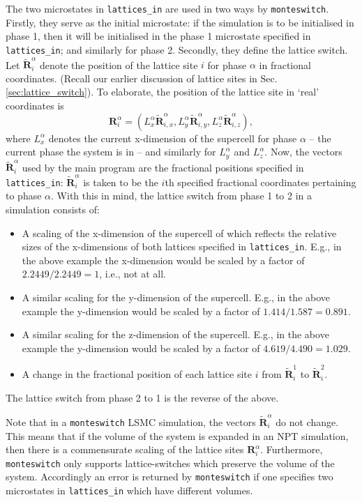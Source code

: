 \documentclass{report}
\begin{document}
The two microstates in \texttt{lattices\_in} are used in two ways by \texttt{monteswitch}. Firstly, they serve as the initial microstate: if the 
simulation is to be initialised in phase 1, then it will be initialised in the phase 1 microstate specified in \texttt{lattices\_in}; and 
similarly for phase 2. Secondly, they define the lattice switch. Let $\tilde{\mathbf{R}}^{\alpha}_i$ denote the position of the lattice site $i$
for phase $\alpha$ in fractional coordinates. (Recall our earlier discussion of lattice sites in Sec. \ref{sec:lattice_switch}). To elaborate,
the position of the lattice site in `real' coordinates is 
\begin{equation}
\mathbf{R}^{\alpha}_i=(L_x^{\alpha}\tilde{\mathbf{R}}^{\alpha}_{i,x},L_y^{\alpha}\tilde{\mathbf{R}}^{\alpha}_{i,y},L_z^{\alpha}\tilde{\mathbf{R}}^{\alpha}_{i,z}),
\end{equation}
where $L_x^{\alpha}$ denotes the current x-dimension of the supercell for phase $\alpha$ -- the current phase the system is in -- and similarly for
$L_y^{\alpha}$ and $L_z^{\alpha}$. Now, the vectors $\tilde{\mathbf{R}}^{\alpha}_i$ used by the main program are the fractional positions specified in 
\texttt{lattices\_in}: $\tilde{\mathbf{R}}^{\alpha}_i$ is taken to be the $i$th specified fractional coordinates pertaining to phase $\alpha$.
With this in mind, the lattice switch from phase 1 to 2 in a simulation consists of:
\begin{itemize}
\item A scaling of the x-dimension of the supercell of which reflects the relative sizes of the x-dimensions of both lattices specified in 
\texttt{lattices\_in}. E.g., in the above example the x-dimension would be scaled by a factor of $2.2449/2.2449=1$, i.e., not at all.
\item A similar scaling for the y-dimension of the supercell. E.g., in the above example the y-dimension would be scaled by a factor of
$1.414/1.587=0.891$.
\item A similar scaling for the z-dimension of the supercell. E.g., in the above example the y-dimension would be scaled by a factor of
$4.619/4.490=1.029$.
\item A change in the fractional position of each lattice site $i$ from $\tilde{\mathbf{R}}^{1}_i$ to $\tilde{\mathbf{R}}^{2}_i$.
\end{itemize}
The lattice switch from phase 2 to 1 is the reverse of the above.

Note that in a \texttt{monteswitch} LSMC simulation, the vectors $\tilde{\mathbf{R}}^{\alpha}_i$ do not change. This means that
if the volume of the system is expanded in an NPT simulation, then there is a commensurate scaling of the lattice sites 
$\mathbf{R}^{\alpha}_i$. Furthermore, \texttt{monteswitch} only supports lattice-switches which preserve the volume of the system.
Accordingly an error is returned by \texttt{monteswitch} if one specifies two microstates in \texttt{lattices\_in} which have different
volumes.
\end{document}
